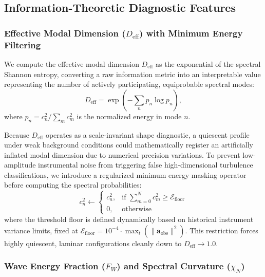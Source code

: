 \subsection{Information-Theoretic Diagnostic Features}
\label{sec:methods:diagnostics}

\subsubsection{Effective Modal Dimension ($D_{\mathrm{eff}}$) with Minimum Energy Filtering}

We compute the effective modal dimension $D_{\mathrm{eff}}$ as the exponential of the spectral Shannon entropy, converting a raw information metric into an interpretable value representing the number of actively participating, equiprobable spectral modes:
\begin{equation}
D_{\mathrm{eff}} = \exp\left( -\sum_n p_n \log p_n \right),
\label{eq:d_eff_def}
\end{equation}
where $p_n = c_n^2 / \sum_m c_m^2$ is the normalized energy in mode $n$.

Because $D_{\mathrm{eff}}$ operates as a scale-invariant shape diagnostic, a quiescent profile under weak background conditions could mathematically register an artificially inflated modal dimension due to numerical precision variations. To prevent low-amplitude instrumental noise from triggering false high-dimensional turbulence classifications, we introduce a regularized minimum energy masking operator before computing the spectral probabilities:
\begin{equation}
c_n^2 \leftarrow \begin{cases}
c_n^2, & \text{if } \sum_{m=0}^{N} c_m^2 \ge \mathcal{E}_{\text{floor}} \\
0, & \text{otherwise}
\end{cases}
\label{eq:energy_floor}
\end{equation}
where the threshold floor is defined dynamically based on historical instrument variance limits, fixed at $\mathcal{E}_{\text{floor}} = 10^{-4} \cdot \max_{t} \left(\|\mathbf{a}_{\mathrm{obs}}\|^2\right)$. This restriction forces highly quiescent, laminar configurations cleanly down to $D_{\mathrm{eff}} \to 1.0$.

\subsubsection{Wave Energy Fraction ($F_W$) and Spectral Curvature ($\chi_N$)}

